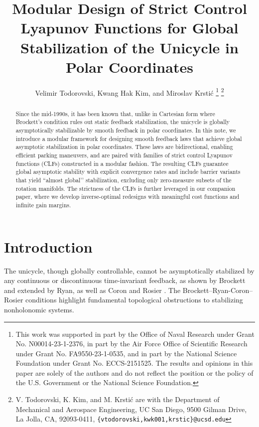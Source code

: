 \documentclass[letterpaper, 10 pt, conference]{ieeeconf}  %
\title{\LARGE \bf
Modular Design of Strict Control Lyapunov Functions for Global Stabilization of the Unicycle in Polar Coordinates
}
\author{Velimir Todorovski, Kwang Hak Kim, and Miroslav Krstić%
\thanks{This work was supported in part by the Office of Naval Research under Grant No. N00014-23-1-2376, in part by the Air Force Office of Scientific Research under Grant No. FA9550-23-1-0535, and in
part by the National Science Foundation under Grant No. ECCS-2151525. The results and opinions in this paper are solely of the authors and do not reflect the position or the policy of the U.S. Government or the National Science
Foundation.}%
\thanks{V. Todorovski, K. Kim,  and M. Krstić are with the Department of Mechanical and Aerospace Engineering, UC San Diego, 9500 Gilman Drive, La Jolla, CA, 92093-0411, {\tt\small \{vtodorovski,kwk001,krstic\}@ucsd.edu}}%
}
\begin{document}
\maketitle
\thispagestyle{empty}
\pagestyle{empty}


\begin{abstract}
Since the mid-1990s, it has been known that, unlike in Cartesian form where Brockett’s condition rules out static feedback stabilization, the unicycle is globally asymptotically stabilizable by smooth feedback in polar coordinates. In this note, we introduce a modular framework for designing smooth feedback laws that achieve global asymptotic stabilization in polar coordinates. These laws are bidirectional, enabling efficient parking maneuvers, and are paired with families of strict control Lyapunov functions (CLFs) constructed in a modular fashion. The resulting CLFs guarantee global asymptotic stability with explicit convergence rates and include barrier variants that yield “almost global’’ stabilization, excluding only zero-measure subsets of the rotation manifolds. The strictness of the CLFs is further leveraged in our companion paper, where we develop inverse-optimal redesigns with meaningful cost functions and infinite gain margins.
\end{abstract}


\section{Introduction}

The unicycle, though globally controllable, cannot be asymptotically stabilized by any continuous or discontinuous time-invariant feedback, as shown by Brockett \cite{brockett1983asymptotic} and extended by Ryan, as well as Coron and Rosier \cite{ryan1994brockett,coron1994relation}. The Brockett–Ryan-Coron–Rosier conditions highlight fundamental topological obstructions to stabilizing nonholonomic systems.
\end{document}
